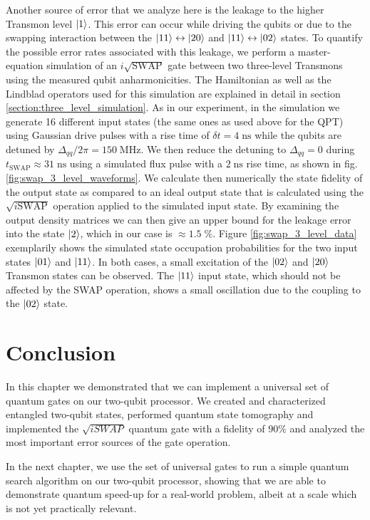 Another source of error that we analyze here is the leakage to the higher Transmon level $\left| 1 \right>$. This error can occur while driving the qubits or due to the swapping interaction between the $\left| 11 \right>\leftrightarrow\left| 20 \right>$ and $\left| 11 \right>\leftrightarrow\left| 02 \right>$ states. To quantify the possible error rates associated with this leakage, we perform a master-equation simulation of an $i\sqrt{\mathrm{SWAP}}$ gate between two three-level Transmons using the measured qubit anharmonicities. The Hamiltonian as well as the Lindblad operators used for this simulation are explained in detail in section \ref{section:three_level_simulation}. As in our experiment, in the simulation we generate 16 different input states (the same ones as used above for the QPT) using Gaussian drive pulses with a rise time of $\delta t = 4\;\mathrm{ns}$ while the qubits are detuned by $\Delta_{qq}/2\pi = 150\;\mathrm{MHz}$. We then reduce the detuning to $\Delta_{qq} = 0$ during $t_\mathrm{SWAP}\approx 31 \;\mathrm{ns}$ using a simulated flux pulse with a $2\;\mathrm{ns}$ rise time, as shown in fig. \ref{fig:swap_3_level_waveforms}. We calculate then numerically the state fidelity of the output state as compared to an ideal output state that is calculated using the $\sqrt{i\mathrm{SWAP}}$ operation applied to the simulated input state. By examining the output density matrices we can then give an upper bound for the leakage error into the state $\left| 2 \right>$, which in our case is $\approx 1.5\;\%$. Figure \ref{fig:swap_3_level_data} exemplarily shows the simulated state occupation probabilities for the two input states $\left| 01 \right>$ and $\left| 11 \right>$. In both cases, a small excitation of the $\left| 02 \right>$ and $\left| 20 \right>$ Transmon states can be observed. The $\left| 11 \right>$ input state, which should not be affected by the SWAP operation, shows a small oscillation due to the coupling to the $\left| 02 \right>$ state.

\section{Conclusion}

In this chapter we demonstrated that we can implement a universal set of quantum gates on our two-qubit processor. We created and characterized entangled two-qubit states, performed quantum state tomography and implemented the $\sqrt{iSWAP}$ quantum gate with a fidelity of $90\%$ and analyzed the most important error sources of the gate operation.

\smallskip

In the next chapter, we use the set of universal gates to run a simple quantum search algorithm on our two-qubit processor, showing that we are able to demonstrate quantum speed-up for a real-world problem, albeit at a scale which is not yet practically relevant.